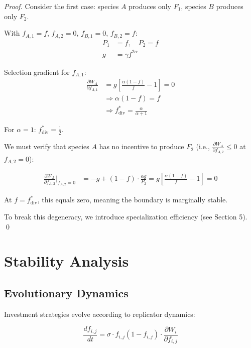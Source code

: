 \documentclass[11pt]{article}
\theoremstyle{definition}
\theoremstyle{remark}
\newcommand{\ddt}[1]{\frac{d#1}{dt}}
\newcommand{\pd}[2]{\frac{\partial #1}{\partial #2}}
\begin{document}
\begin{proof}
Consider the first case: species $A$ produces only $F_1$, species $B$ produces only $F_2$.

With $f_{A,1} = f$, $f_{A,2} = 0$, $f_{B,1} = 0$, $f_{B,2} = f$:
\begin{align}
P_1 &= f, \quad P_2 = f\\
g &= \gamma f^{2\alpha}
\end{align}

Selection gradient for $f_{A,1}$:
\begin{align}
\pd{W_A}{f_{A,1}} &= g \left[ \frac{\alpha(1 - f)}{f} - 1 \right] = 0\\
&\Rightarrow \alpha(1 - f) = f\\
&\Rightarrow f^*_{\text{div}} = \frac{\alpha}{\alpha + 1}
\end{align}

For $\alpha = 1$: $f^*_{\text{div}} = \frac{1}{2}$.

We must verify that species $A$ has no incentive to produce $F_2$ (i.e., $\pd{W_A}{f_{A,2}} \leq 0$ at $f_{A,2} = 0$):

\begin{align}
\pd{W_A}{f_{A,2}}\bigg|_{f_{A,2}=0} &= -g + (1-f) \cdot \frac{\alpha g}{P_2} = g\left[\frac{\alpha(1-f)}{f} - 1\right] = 0
\end{align}

At $f = f^*_{\text{div}}$, this equals zero, meaning the boundary is marginally stable.

To break this degeneracy, we introduce specialization efficiency (see Section 5). \qed
\end{proof}

\section{Stability Analysis}

\subsection{Evolutionary Dynamics}

Investment strategies evolve according to replicator dynamics:

\begin{equation}
\ddt{f_{i,j}} = \sigma \cdot f_{i,j} (1 - f_{i,j}) \cdot \pd{W_i}{f_{i,j}} \label{eq:replicator}
\end{equation}
\end{document}
